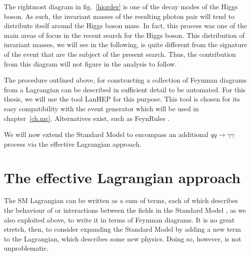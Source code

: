 The rightmost diagram in fig.~\ref{hiorder} is one of the decay modes of the Higgs boson. As such, the invariant masses of the resulting photon pair will tend to distribute itself around the Higgs boson mass. In fact, this process was one of the main areas of focus in the recent search for the Higgs boson. This distribution of invariant masses, we will see in the following, is quite different from the signature of the event that are the subject of the present search. Thus, the contribution from this diagram will not figure in the analysis to follow.

The procedure outlined above, for constructing a collection of Feynman diagrams from a Lagrangian can be described in sufficient detail to be automated. For this thesis, we will use the tool LanHEP \cite{lanhep} for this purpose. This tool is chosen for its easy compatibility with the event generator which will be used in chapter~\ref{ch.mc}. Alternatives exist, such as FeynRules \cite{feynrules}.

We will now extend the Standard Model to encompass an additional $qq\rightarrow\gamma\gamma$ process via the effective Lagrangian approach.

\section{The effective Lagrangian approach}

The SM Lagrangian can be written as a sum of terms, each of which describes the behaviour of or interactions between the fields in the Standard Model \cite{srednicki}, as we also exploited above, to write it in terms of Feynman diagrams. It is no great stretch, then, to consider expanding the Standard Model by adding a new term to the Lagrangian, which describes some new physics. Doing so, however, is not unproblematic.


